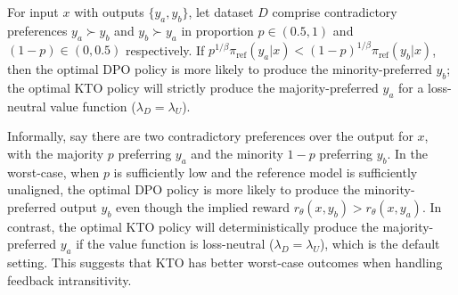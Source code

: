 \begin{table}[t]
\tiny
\centering
\caption{In aligning Mistral-7B on the OpenAssistant dataset, we find that using KTO with only one output per input still outperforms DPO, despite this restriction reducing the amount of training data by 72\%. A 90\% binomial confidence interval is given.}
\label{tab:mistral}
\end{table}

\begin{theorem}
\label{theorem:intransitive}
For input $x$ with outputs $\{y_a, y_b\}$, let dataset $D$ comprise contradictory preferences $y_a \succ y_b$ and $y_b \succ y_a$ in proportion $p \in (0.5, 1)$ and $(1 - p) \in (0, 0.5)$ respectively. 
If $p^{1/\beta} \pi_\text{ref}(y_a|x) < (1 - p)^{1/\beta} \pi_\text{ref}(y_b|x)$, then the optimal DPO policy is more likely to produce the minority-preferred $y_b$; the optimal KTO policy will strictly produce the majority-preferred $y_a$ for a loss-neutral value function ($\lambda_D = \lambda_U$). 
\end{theorem}

Informally, say there are two contradictory preferences over the output for $x$, with the majority $p$ preferring $y_a$ and the minority $1 - p$ preferring $y_b$.
In the worst-case, when $p$ is sufficiently low and the reference model is sufficiently unaligned, the optimal DPO policy is more likely to produce the minority-preferred output $y_b$ even though the implied reward $r_\theta(x, y_b) > r_\theta(x, y_a)$.
In contrast, the optimal KTO policy will deterministically produce the majority-preferred $y_a$ if the value function is loss-neutral ($\lambda_D = \lambda_U$), which is the default setting.
This suggests that KTO has better worst-case outcomes when handling feedback intransitivity.

